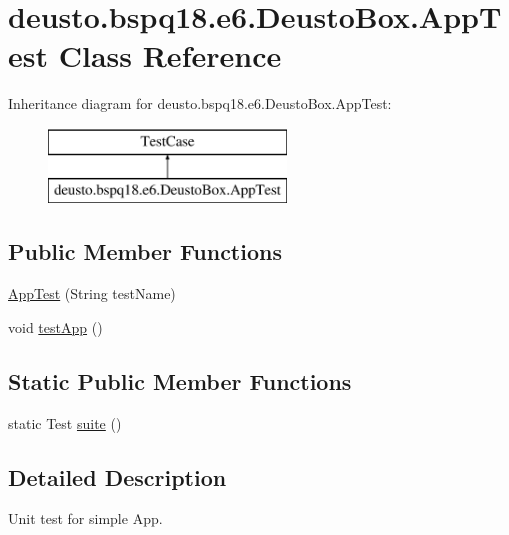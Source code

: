 \hypertarget{classdeusto_1_1bspq18_1_1e6_1_1_deusto_box_1_1_app_test}{}\section{deusto.\+bspq18.\+e6.\+Deusto\+Box.\+App\+Test Class Reference}
\label{classdeusto_1_1bspq18_1_1e6_1_1_deusto_box_1_1_app_test}
Inheritance diagram for deusto.\+bspq18.\+e6.\+Deusto\+Box.\+App\+Test\+:\begin{figure}[H]
\begin{center}
\leavevmode
\includegraphics[height=2.000000cm]{classdeusto_1_1bspq18_1_1e6_1_1_deusto_box_1_1_app_test}
\end{center}
\end{figure}
\subsection*{Public Member Functions}
\begin{DoxyCompactItemize}
\item 
\mbox{\hyperlink{classdeusto_1_1bspq18_1_1e6_1_1_deusto_box_1_1_app_test_a3c063a4941fa084c956cfd3b68a35d71}{App\+Test}} (String test\+Name)
\item 
void \mbox{\hyperlink{classdeusto_1_1bspq18_1_1e6_1_1_deusto_box_1_1_app_test_a9928f1fed754302ca8ef4ee297c6affd}{test\+App}} ()
\end{DoxyCompactItemize}
\subsection*{Static Public Member Functions}
\begin{DoxyCompactItemize}
\item 
static Test \mbox{\hyperlink{classdeusto_1_1bspq18_1_1e6_1_1_deusto_box_1_1_app_test_acf89b308ab029254e043fbe358355a4a}{suite}} ()
\end{DoxyCompactItemize}


\subsection{Detailed Description}
Unit test for simple App. 

